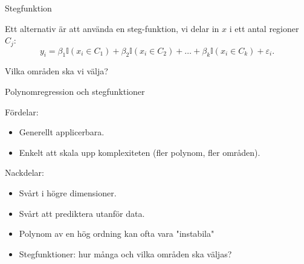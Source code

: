 \documentclass[10pt,english]{beamer}
\begin{document}



\begin{frame}{Stegfunktion}

    Ett alternativ är att använda en steg-funktion, vi delar in $x$ i ett antal regioner $C_j$:
    \begin{equation*}
        y_i = \beta_1 \mathbb{I}(x_i \in C_1) + \beta_2 \mathbb{I}(x_i \in C_2) + \ldots + \beta_k \mathbb{I}(x_i \in C_k) + \varepsilon_i.
    \end{equation*}
    
    Vilka områden ska vi välja?


\end{frame}

\begin{frame}{Polynomregression och stegfunktioner}
    
    Fördelar:
    \begin{itemize}
        \item Generellt applicerbara.
        \item Enkelt att skala upp komplexiteten (fler polynom, fler områden).
    \end{itemize}

    Nackdelar:
    \begin{itemize}
        \item Svårt i högre dimensioner.
        \item Svårt att prediktera utanför data.
        \item Polynom av en hög ordning kan ofta vara "instabila"
        \item Stegfunktioner: hur många och vilka områden ska väljas?
    \end{itemize}
\end{frame}
\end{document}
